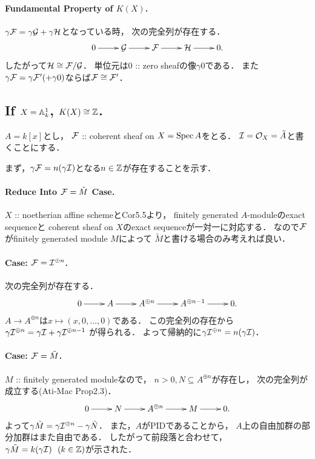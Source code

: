 \documentclass[a4paper]{jsarticle}
\begin{document}
    \paragraph{Fundamental Property of $K(X)$.}
    $\gamma \mathcal{F}=\gamma \mathcal{G}+\gamma \mathcal{H}$となっている時，
    次の完全列が存在する．
    \[
        \xymatrix
        {
            0 \ar[r]& \shG \ar[r]& \shF \ar[r]& \shH \ar[r]& 0.
        }
    \]
    したがって$\mathcal{H} \cong \mathcal{F}/\mathcal{G}$．
    単位元は$0$ :: zero sheafの像$\gamma 0$である．
    また$\gamma \mathcal{F}=\gamma \mathcal{F}'(+\gamma 0)$ならば$\mathcal{F} \cong \mathcal{F}'$．

    \subsection{If $X=\mathbb{A}^1_k$, $K(X) \cong \mathbb{Z}$.}
    $A=k[x]$とし，
    $\mathcal{F}$ :: coherent sheaf on $X=\operatorname{Spec} A$をとる．
    $\mathcal{I}=\mathcal{O}_X=\tilde{A}$と書くことにする．

    まず，$\gamma \mathcal{F}=n (\gamma \mathcal{I})$となる$n \in \mathbb{Z}$が存在することを示す．

    \paragraph{Reduce Into $\mathcal{F}=\tilde{M}$ Case.}
    $X$ :: noetherian affine schemeとCor5.5より，
    finitely generated $A$-moduleのexact sequenceと
    coherent sheaf on $X$のexact sequenceが一対一に対応する．
    なので$\mathcal{F}$がfinitely generated module $M$によって
    $\tilde{M}$と書ける場合のみ考えれば良い．

    \paragraph{Case: $\mathcal{F}=\mathcal{I}^{\oplus n}$.}
    次の完全列が存在する．
    \[
        \xymatrix
        {
            0 \ar[r]& A \ar[r]& A^{\oplus n} \ar[r]& A^{\oplus n-1} \ar[r]& 0.
        }
    \]
    $A \to A^{\oplus n}$は$x \mapsto (x,0,\dots,0)$である．
    この完全列の存在から
    $\gamma \mathcal{I}^{\oplus n}=\gamma \mathcal{I}+\gamma \mathcal{I}^{\oplus n-1}$
    が得られる．
    よって帰納的に$\gamma \mathcal{I}^{\oplus n}=n (\gamma \mathcal{I})$．

    \paragraph{Case: $\mathcal{F}=\tilde{M}$.}
    $M$ :: finitely generated moduleなので，
    $n>0, N \subseteq A^{\oplus n}$が存在し，
    次の完全列が成立する(Ati-Mac Prop2.3)．
    \[
        \xymatrix
        {
            0 \ar[r]& N \ar[r]& A^{\oplus n} \ar[r]& M \ar[r]& 0.
        }
    \]
    よって$\gamma \tilde{M}=\gamma \mathcal{I}^{\oplus n}-\gamma \tilde{N}$．
    また，$A$がPIDであることから，
    $A$上の自由加群の部分加群はまた自由である．
    したがって前段落と合わせて，
    $\gamma \tilde{M}=k (\gamma \mathcal{I}) ~~(k \in \mathbb{Z})$が示された．
\end{document}
